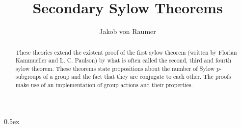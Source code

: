 \documentclass[11pt,a4paper]{article}
\begin{document}
\title{Secondary Sylow Theorems}
\author{Jakob von Raumer}
\maketitle

\begin{abstract}
These theories extend the existent proof of the first sylow theorem (written by Florian Kammueller and L. C. Paulson)
by what is often called the second, third and fourth sylow theorem. These theorems state propositions about the number
of Sylow $p$-subgroups of a group and the fact that they are conjugate to each other. The proofs make use of an implementation
of group actions and their properties.
\end{abstract}

\tableofcontents

\parindent 0pt\parskip 0.5ex



%
%
\end{document}
